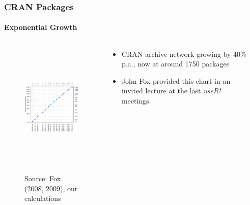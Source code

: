 \documentclass[smaller,compress]{beamer}
\begin{document}
\begin{frame}
  \frametitle{CRAN Packages} %
  \framesubtitle{Exponential Growth}

  \begin{columns}
    \begin{column}{3in}
      \begin{figure}
        \includegraphics[height=6cm,transparent]{figures/Packages}

        \begin{scriptsize}
          Source: Fox (2008, 2009), our calculations
        \end{scriptsize}
      \end{figure}
    \end{column}
    \begin{column}{2in}
      \begin{itemize} 
        \item CRAN archive network growing by 40\% p.a., now at around 1750 packages

        \item John Fox provided this chart in an invited lecture at the last
        \emph{useR!} meetings.
      \end{itemize}
    \end{column}
    \begin{column}{0.25in}
      \phantom{XX}
    \end{column}
  \end{columns}  
\end{frame}
\end{document}
